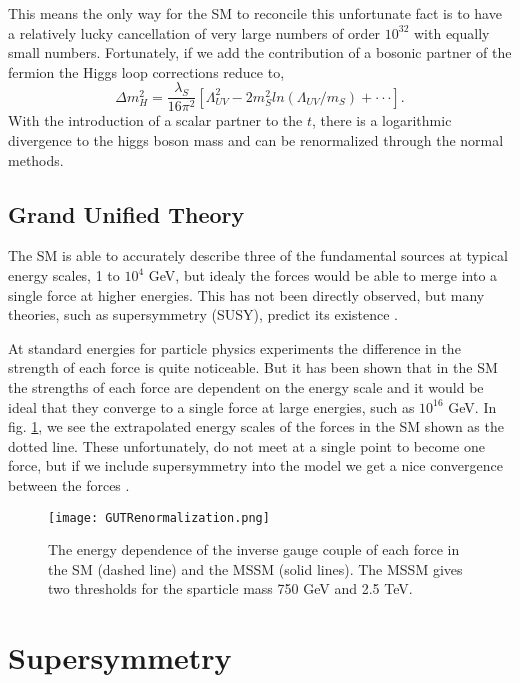 This means the only way for the SM to reconcile this unfortunate fact is to have a relatively lucky cancellation of very large numbers of order $10^{32}$ with equally small numbers. Fortunately, if we add the contribution of a bosonic partner of the fermion the Higgs loop corrections reduce to,
\begin{equation}
\Delta m_{H}^{2}=\frac{\lambda_{S}}{16\pi^{2}}[\Lambda_{UV}^{2} - 2m_{S}^{2}ln(\Lambda_{UV}/m_{S})+\cdot\cdot\cdot].
\label{HiggsRenormalization}
\end{equation}
With the introduction of a scalar partner to the $t$, there is a logarithmic divergence to the higgs boson mass and can be renormalized through the normal methods.

\subsection{Grand Unified Theory}

The SM is able to accurately describe three of the fundamental sources at typical energy scales, 1 to $10^{4}$ GeV, but idealy the forces would be able to merge into a single force at higher energies. This has not been directly observed, but many theories, such as supersymmetry (SUSY), predict its existence \cite{martin_supersymmetry_1997}.

At standard energies for particle physics experiments the difference in the strength of each force is quite noticeable. But it has been shown that in the SM the strengths of each force are dependent on the energy scale and it would be ideal that they converge to a single force at large energies, such as $10^{16}$ GeV. In fig. \ref{GUT}, we see the extrapolated energy scales of the forces in the SM shown as the dotted line. These unfortunately, do not meet at a single point to become one force, but if we include supersymmetry into the model we get a nice convergence between the forces \cite{martin_supersymmetry_1997}.

\begin{figure}
 	\centering
	\texttt{[image: GUTRenormalization.png]}
 	\caption[GUT Force Energy Dependence]{The energy dependence of the inverse gauge couple of each force in the SM (dashed line) and the MSSM (solid lines). The MSSM gives two thresholds for the sparticle mass 750 GeV and 2.5 TeV.}
 	\label{GUT} 
\end{figure}

\section{Supersymmetry}\label{sec:SUSY}

